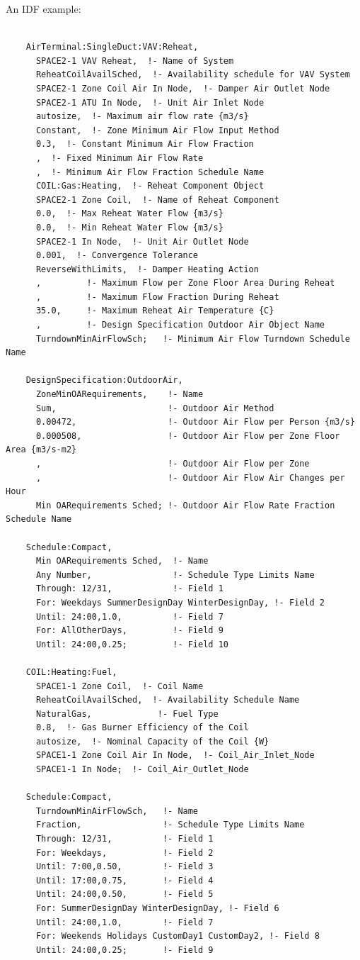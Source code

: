 An IDF example:

\begin{lstlisting}

    AirTerminal:SingleDuct:VAV:Reheat,
      SPACE2-1 VAV Reheat,  !- Name of System
      ReheatCoilAvailSched,  !- Availability schedule for VAV System
      SPACE2-1 Zone Coil Air In Node,  !- Damper Air Outlet Node
      SPACE2-1 ATU In Node,  !- Unit Air Inlet Node
      autosize,  !- Maximum air flow rate {m3/s}
      Constant,  !- Zone Minimum Air Flow Input Method
      0.3,  !- Constant Minimum Air Flow Fraction
      ,  !- Fixed Minimum Air Flow Rate
      ,  !- Minimum Air Flow Fraction Schedule Name
      COIL:Gas:Heating,  !- Reheat Component Object
      SPACE2-1 Zone Coil,  !- Name of Reheat Component
      0.0,  !- Max Reheat Water Flow {m3/s}
      0.0,  !- Min Reheat Water Flow {m3/s}
      SPACE2-1 In Node,  !- Unit Air Outlet Node
      0.001,  !- Convergence Tolerance
      ReverseWithLimits,  !- Damper Heating Action
      ,         !- Maximum Flow per Zone Floor Area During Reheat
      ,         !- Maximum Flow Fraction During Reheat
      35.0,     !- Maximum Reheat Air Temperature {C}
      ,         !- Design Specification Outdoor Air Object Name
      TurndownMinAirFlowSch;   !- Minimum Air Flow Turndown Schedule Name

    DesignSpecification:OutdoorAir,
      ZoneMinOARequirements,    !- Name
      Sum,                      !- Outdoor Air Method
      0.00472,                  !- Outdoor Air Flow per Person {m3/s}
      0.000508,                 !- Outdoor Air Flow per Zone Floor Area {m3/s-m2}
      ,                         !- Outdoor Air Flow per Zone
      ,                         !- Outdoor Air Flow Air Changes per Hour
      Min OARequirements Sched; !- Outdoor Air Flow Rate Fraction Schedule Name

    Schedule:Compact,
      Min OARequirements Sched,  !- Name
      Any Number,                !- Schedule Type Limits Name
      Through: 12/31,            !- Field 1
      For: Weekdays SummerDesignDay WinterDesignDay, !- Field 2
      Until: 24:00,1.0,          !- Field 7
      For: AllOtherDays,         !- Field 9
      Until: 24:00,0.25;         !- Field 10

    COIL:Heating:Fuel,
      SPACE1-1 Zone Coil,  !- Coil Name
      ReheatCoilAvailSched,  !- Availability Schedule Name
      NaturalGas,             !- Fuel Type
      0.8,  !- Gas Burner Efficiency of the Coil
      autosize,  !- Nominal Capacity of the Coil {W}
      SPACE1-1 Zone Coil Air In Node,  !- Coil_Air_Inlet_Node
      SPACE1-1 In Node;  !- Coil_Air_Outlet_Node

    Schedule:Compact,
      TurndownMinAirFlowSch,   !- Name
      Fraction,                !- Schedule Type Limits Name
      Through: 12/31,          !- Field 1
      For: Weekdays,           !- Field 2
      Until: 7:00,0.50,        !- Field 3
      Until: 17:00,0.75,       !- Field 4
      Until: 24:00,0.50,       !- Field 5
      For: SummerDesignDay WinterDesignDay, !- Field 6
      Until: 24:00,1.0,        !- Field 7
      For: Weekends Holidays CustomDay1 CustomDay2, !- Field 8
      Until: 24:00,0.25;       !- Field 9
\end{lstlisting}

